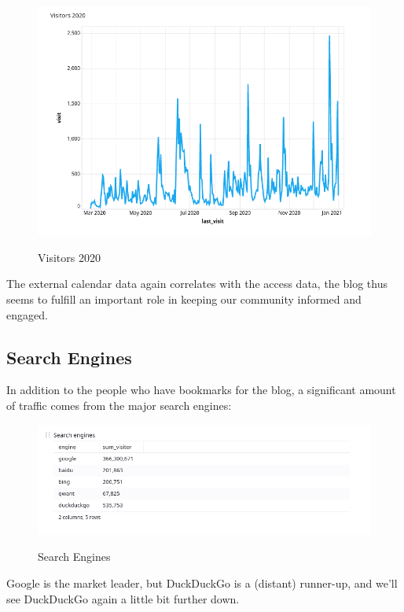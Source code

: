\begin{figure}[H]
\centering
\caption {Visitors 2020}
\includegraphics[width=\linewidth]{images/figure02.png}
\label{fig:vistors2020}
\end{figure}

The external calendar data again correlates with the access data, the blog thus seems to fulfill an important role in keeping our community informed and engaged.

\subsection{Search Engines}

In addition to the people who have bookmarks for the blog, a significant amount of traffic comes from the major search engines:

\begin{figure}[H]
\centering
\caption {Search Engines}
\includegraphics[width=\linewidth]{images/figure03.png}
\label{fig:searchEngines}
\end{figure}

Google is the market leader, but DuckDuckGo is a (distant) runner-up, and we'll see DuckDuckGo again a little bit further down.

